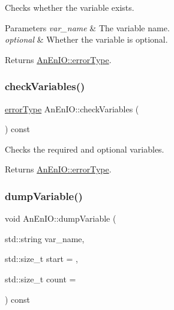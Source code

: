 Checks whether the variable exists. 
\begin{DoxyParams}{Parameters}
{\em var\+\_\+name} & The variable name. \\
\hline
{\em optional} & Whether the variable is optional. \\
\hline
\end{DoxyParams}
\begin{DoxyReturn}{Returns}
\mbox{\hyperlink{class_an_en_i_o_aa56bc1ec6610b86db4349bce20f9ead0}{An\+En\+I\+O\+::error\+Type}}. 
\end{DoxyReturn}
\mbox{\label{class_an_en_i_o_a44347f497bdf775fcf214ec75d8b6470}} 
\subsubsection{\texorpdfstring{check\+Variables()}{checkVariables()}}
{\footnotesize\ttfamily \mbox{\hyperlink{class_an_en_i_o_aa56bc1ec6610b86db4349bce20f9ead0}{error\+Type}} An\+En\+I\+O\+::check\+Variables (\begin{DoxyParamCaption}{ }\end{DoxyParamCaption}) const}

Checks the required and optional variables. \begin{DoxyReturn}{Returns}
\mbox{\hyperlink{class_an_en_i_o_aa56bc1ec6610b86db4349bce20f9ead0}{An\+En\+I\+O\+::error\+Type}}. 
\end{DoxyReturn}
\mbox{\label{class_an_en_i_o_acd5682e81361d75ff5566ae1df5fa023}} 
\subsubsection{\texorpdfstring{dump\+Variable()}{dumpVariable()}}
{\footnotesize\ttfamily void An\+En\+I\+O\+::dump\+Variable (\begin{DoxyParamCaption}\item[{std\+::string}]{var\+\_\+name,  }\item[{std\+::size\+\_\+t}]{start = {},  }\item[{std\+::size\+\_\+t}]{count = {} }\end{DoxyParamCaption}) const}

